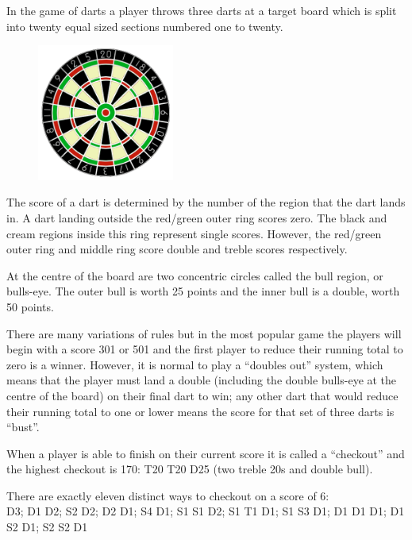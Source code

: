 \footnotesize
In the game of darts a player throws three darts at a target board which is split into twenty equal sized sections numbered one to twenty.
\vspace{-0.4cm}
\begin{center}
\begin{figure}[h]
\centering
\includegraphics[width = 0.40\textwidth]{./images/p_109.png}
\end{figure}
\end{center}
\vspace{-1.25cm}
The score of a dart is determined by the number of the region that the dart lands in. A dart landing outside the red/green outer ring scores zero. The black and cream regions inside this ring represent single scores. However, the red/green outer ring and middle ring score double and treble scores respectively.

At the centre of the board are two concentric circles called the bull region, or bulls-eye. The outer bull is worth 25 points and the inner bull is a double, worth 50 points.

There are many variations of rules but in the most popular game the players will begin with a score 301 or 501 and the first player to reduce their running total to zero is a winner. However, it is normal to play a ``doubles out'' system, which means that the player must land a double (including the double bulls-eye at the centre of the board) on their final dart to win; any other dart that would reduce their running total to one or lower means the score for that set of three darts is ``bust''.

When a player is able to finish on their current score it is called a ``checkout'' and the highest checkout is 170: T20 T20 D25 (two treble 20s and double bull).  

There are exactly eleven distinct ways to checkout on a score of 6:\\
D3; D1 D2; S2 D2; D2 D1; S4 D1; S1 	S1 	D2; S1 	T1 	D1; S1 	S3 	D1; D1 	D1 	D1; D1 	S2 	D1; S2 	S2 	D1

